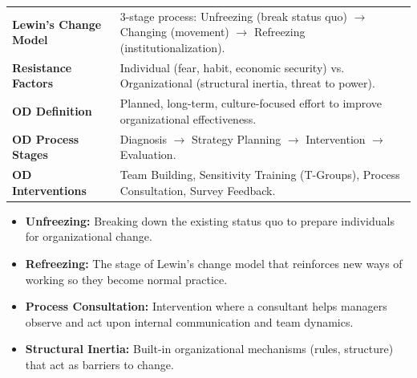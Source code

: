 \documentclass[12pt,a4paper]{article}
\renewcommand{\arraystretch}{1.45}
\begin{document}
\begin{tcolorbox}[formulabox, title={\textbf{Key Concepts and Metrics at a Glance}}]
\renewcommand{\arraystretch}{1.35}
\begin{tabularx}{\linewidth}{>{\raggedright\arraybackslash\bfseries}p{4.5cm} X}
Lewin's Change Model & 3-stage process: Unfreezing (break status quo) $\to$ Changing (movement) $\to$ Refreezing (institutionalization). \\[4pt]
Resistance Factors & Individual (fear, habit, economic security) vs. Organizational (structural inertia, threat to power). \\[4pt]
OD Definition & Planned, long-term, culture-focused effort to improve organizational effectiveness. \\[4pt]
OD Process Stages & Diagnosis $\to$ Strategy Planning $\to$ Intervention $\to$ Evaluation. \\[4pt]
OD Interventions & Team Building, Sensitivity Training (T-Groups), Process Consultation, Survey Feedback. \\
\end{tabularx}
\end{tcolorbox}

\begin{tcolorbox}[defbox, title={\textbf{One-Line Definitions for Exam Revision}}]
  \begin{itemize}[leftmargin=*, itemsep=2pt]
    \item \textbf{Unfreezing:} Breaking down the existing status quo to prepare individuals for organizational change.
    \item \textbf{Refreezing:} The stage of Lewin's change model that reinforces new ways of working so they become normal practice.
    \item \textbf{Process Consultation:} Intervention where a consultant helps managers observe and act upon internal communication and team dynamics.
    \item \textbf{Structural Inertia:} Built-in organizational mechanisms (rules, structure) that act as barriers to change.
  \end{itemize}
\end{tcolorbox}
\end{document}
